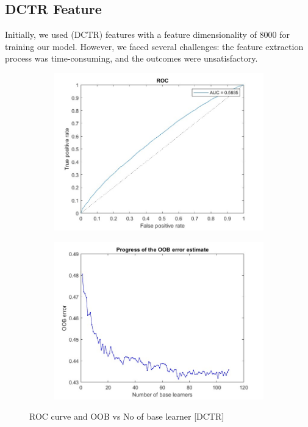 \subsection{DCTR Feature}
Initially, we used (DCTR) features with a feature dimensionality of 8000 for training our model. However, we faced several challenges: the feature extraction process was time-consuming, and the outcomes were unsatisfactory.\\
\begin{figure}[H]
    \begin{subfigure}[b]{0.5\textwidth}
        \includegraphics[width=\textwidth]{img/rocdctr.jpg}
    \end{subfigure}
    \hfill
    \begin{subfigure}[b]{0.5\textwidth}
        \includegraphics[width=\textwidth]{img/saturationdctr.jpg}
    \end{subfigure}
    \caption{ROC curve and OOB vs No of base learner [DCTR]}
\end{figure}
